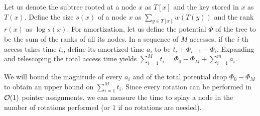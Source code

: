 Let us denote the subtree rooted at a node $x$ as $T[x]$
and the key stored in $x$ as $T(x)$. Define the size $s(x)$ of a node $x$ as
$\sum_{y\in T[x]} w(T(y))$ and the rank $r(x)$ as $\log s(x)$.
For amortization, let us define the potential $\Phi$ of the tree to be the sum
of the ranks of all its nodes. In a sequence of $M$ accesses, if the $i$-th
access takes time $t_i$, define its amortized time $a_i$ to be
$t_i+\Phi_{i-1}-\Phi_{i}$. Expanding and telescoping the total access time
yields $\sum_{i=1}^M t_i=\Phi_0-\Phi_M+\sum_{i=1}^m a_i$.

We will bound the magnitude of every $a_i$ and of the total potential drop
$\Phi_0-\Phi_M$ to obtain an upper bound on $\sum_{i=1}^M t_i$.
Since every rotation can be performed in $\mathcal{O}(1)$
pointer assignments, we can measure the time to splay a node in the number
of rotations performed (or 1 if no rotations are needed).

